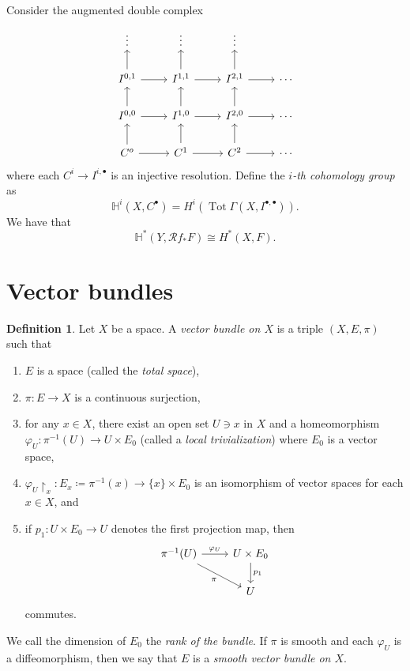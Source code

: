 \documentclass[10pt,letterpaper,cm]{nupset}
\theoremstyle{definition}
\newtheorem{definition}{Definition}[subsection]
\theoremstyle{theorem}
\theoremstyle{remark}
\newcommand{\1}{\mathbb{1}}
\newcommand{\0}{\vec 0}
\DeclareMathOperator{\tot}{Tot}
\begin{document}
Consider the augmented double complex 
\[
\begin{tikzcd}
\vdots                        & \vdots                        & \vdots                        &        \\
{I^{0,1}} \arrow[u] \arrow[r] & {I^{1,1}} \arrow[u] \arrow[r] & {I^{2,1}} \arrow[u] \arrow[r] & \cdots \\
{I^{0,0}} \arrow[u] \arrow[r] & {I^{1,0}} \arrow[u] \arrow[r] & {I^{2,0}} \arrow[u] \arrow[r] & \cdots \\
C^o \arrow[u] \arrow[r]       & C^1 \arrow[u] \arrow[r]       & C^2 \arrow[u] \arrow[r]       & \cdots
\end{tikzcd}
\]
where each $C^i \to I^{i, \bullet}$ is an injective resolution. Define the \textit{$i$-th cohomology group} as $$\mathbb{H}^i(X, C^{\bullet}) = H^i(\tot{\Gamma(X, I^{\bullet, \bullet})}) .  $$ We have that $$\mathbb{H}^{\ast}(Y, \mathcal{R}f_{\ast}{F}) \cong H^{\ast}(X, F)  .$$


\section{Vector bundles}

\begin{definition}
Let $X$ be a space. A \textit{vector bundle on $X$} is a triple $\left(X, E, \pi\right)$ such that
\begin{enumerate}[label=(\roman*)]
\item $E$ is a space (called the \textit{total space}), 
\item $\pi: E \to X$ is a continuous surjection,
\item for any $x\in X$, there exist an open set $U \ni x$ in $X$ and a homeomorphism $\varphi_U : \pi^{-1}(U) \to U \times E_0$ (called a \textit{local trivialization}) where $E_0$ is a vector space,
\item  $\varphi_U\restriction_x : E_x\coloneqq \pi^{-1}(x) \to \{x\} \times E_0$ is an isomorphism of vector spaces for each $x\in X$, and
\item if $p_1 : U \times E_0 \to U$ denotes the first projection map, then
\[
\begin{tikzcd}
\pi^{-1}(U) \arrow[r, "\varphi_U"] \arrow[rd, "\pi"'] & U \times E_0 \arrow[d, "p_1"] \\
                                                      & U                            
\end{tikzcd}
\]
commutes.
\end{enumerate}
We call the dimension of $E_0$ the \textit{rank of the bundle}. If $\pi$ is smooth and each $\varphi_U$ is a diffeomorphism, then we say that $E$ is a \textit{smooth vector bundle on $X$}.
\end{definition}
\end{document}
